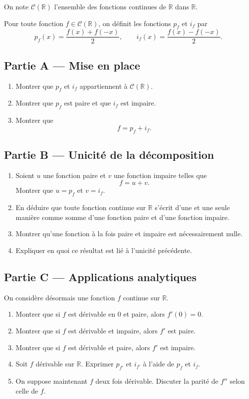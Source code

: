 \documentclass[11pt,a4paper]{article}
\newcommand{\R}{\mathbb{R}}
\newcommand{\cC}{\mathcal{C}}
\begin{document}
On note \(\cC(\R)\) l’ensemble des fonctions continues de \(\R\) dans \(\R\).

Pour toute fonction \(f\in\cC(\R)\), on définit les fonctions \(p_f\) et \(i_f\) par
\[
p_f(x)=\frac{f(x)+f(-x)}{2},
\qquad
i_f(x)=\frac{f(x)-f(-x)}{2}.
\]

\subsection*{Partie A --- Mise en place}

\begin{enumerate}[label=\arabic*.]
    \item Montrer que \(p_f\) et \(i_f\) appartiennent à \(\cC(\R)\).
    \item Montrer que \(p_f\) est paire et que \(i_f\) est impaire.
    \item Montrer que
    \[
    f=p_f+i_f.
    \]
\end{enumerate}

\subsection*{Partie B --- Unicité de la décomposition}

\begin{enumerate}[label=\arabic*.]
    \item Soient \(u\) une fonction paire et \(v\) une fonction impaire telles que
    \[
    f=u+v.
    \]
    Montrer que \(u=p_f\) et \(v=i_f\).
    \item En déduire que toute fonction continue sur \(\R\) s’écrit d’une et une seule manière comme somme d’une fonction paire et d’une fonction impaire.
    \item Montrer qu’une fonction à la fois paire et impaire est nécessairement nulle.
    \item Expliquer en quoi ce résultat est lié à l’unicité précédente.
\end{enumerate}

\subsection*{Partie C --- Applications analytiques}

On considère désormais une fonction \(f\) continue sur \(\R\).

\begin{enumerate}[label=\arabic*.]
    \item Montrer que si \(f\) est dérivable en \(0\) et paire, alors \(f'(0)=0\).
    \item Montrer que si \(f\) est dérivable et impaire, alors \(f'\) est paire.
    \item Montrer que si \(f\) est dérivable et paire, alors \(f'\) est impaire.
    \item Soit \(f\) dérivable sur \(\R\).  
    Exprimer \(p_{f'}\) et \(i_{f'}\) à l’aide de \(p_f\) et \(i_f\).
    \item On suppose maintenant \(f\) deux fois dérivable.  
    Discuter la parité de \(f''\) selon celle de \(f\).
\end{enumerate}
\end{document}
